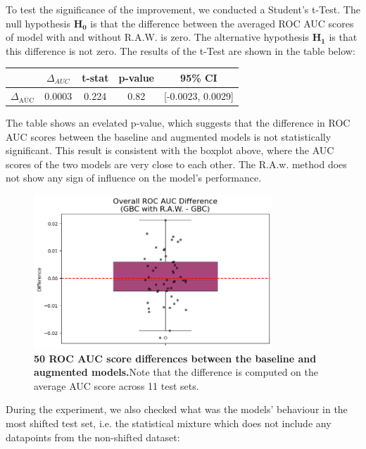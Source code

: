 To test the significance of the improvement, we conducted a Student's t-Test. The null hypothesis $\boldsymbol{H_0}$ is that the difference between the averaged ROC AUC scores of model with and without R.A.W. is zero. The alternative hypothesis $\boldsymbol{H_1}$ is that this difference is not zero. The results of the t-Test are shown in the table below:

\begin{table}[H]
    \centering
    \begin{tabular}{lcccc}
        \toprule
        & $\Delta_{AUC}$ & t-stat & p-value & 95\% CI \\
        \midrule
        $\Delta_{\overline{\text{AUC}}}$ & 0.0003 & 0.224  & 0.82 & [-0.0023, 0.0029] \\
        \bottomrule
    \end{tabular}
\end{table}

The table shows an evelated p-value, which suggests that the difference in ROC AUC scores between the baseline and augmented models is not statistically significant. This result is consistent with the boxplot above, where the AUC scores of the two models are very close to each other. The R.A.w. method does not show any sign of influence on the model's performance.

\begin{figure}[H]
    \centering
    \includegraphics[width=0.8\textwidth]{assets/RealRawdiff.png} 
    \caption{\textbf{50 ROC AUC score differences between the baseline and augmented models.}Note that the difference is computed on the average AUC score across 11 test sets.}
\end{figure}


During the experiment, we also checked what was the models' behaviour in the most shifted test set, i.e. the statistical mixture which does not include any datapoints from the non-shifted dataset:


